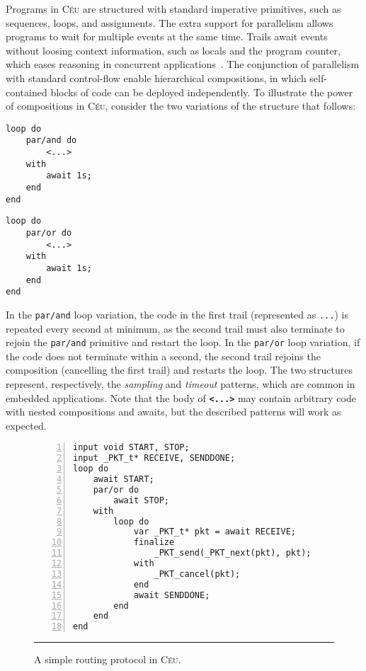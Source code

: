 \documentclass{sig-alternate-ipsn13}
\newcommand{\CEU}{\textsc{C\'{e}u}\xspace}
\newcommand{\code}[1] {{\small{\texttt{#1}}}}
\begin{document}
Programs in \CEU are structured with standard imperative primitives, such as 
sequences, loops, and assignments.
The extra support for parallelism allows programs to wait for multiple events 
at the same time.
Trails await events without loosing context information, such as locals and the 
program counter, which eases reasoning in concurrent 
applications~\cite{sync_async.cooperative}.
%
The conjunction of parallelism with standard control-flow enable hierarchical 
compositions, in which self-contained blocks of code can be deployed 
independently.
%
To illustrate the power of compositions in \CEU, consider the two variations of 
the structure that follows:

\begin{minipage}[t]{0.35\linewidth}
\begin{lstlisting}
loop do
    par/and do
        <...>
    with
        await 1s;
    end
end
\end{lstlisting}
\end{minipage}
%
\hspace{1cm}
%
\begin{minipage}[t]{0.35\linewidth}
\begin{lstlisting}
loop do
    par/or do
        <...>
    with
        await 1s;
    end
end
\end{lstlisting}
\end{minipage}

In the \code{par/and} loop variation, the code in the first trail (represented 
as \code{...}) is repeated every second at minimum, as the second trail must 
also terminate to rejoin the \code{par/and} primitive and restart the loop.
%
In the \code{par/or} loop variation, if the code does not terminate within a 
second, the second trail rejoins the composition (cancelling the first trail) 
and restarts the loop.
%
The two structures represent, respectively, the \emph{sampling} and 
\emph{timeout} patterns, which are common in embedded applications.
%
Note that the body of \textbf{\code{<...>}} may contain arbitrary code with 
nested compositions and awaits, but the described patterns will work as 
expected.

\begin{figure}[t]
\begin{lstlisting}[numbers=left,xleftmargin=3em]
input void START, STOP;
input _PKT_t* RECEIVE, SENDDONE;
loop do
    await START;
    par/or do
        await STOP;
    with
        loop do
            var _PKT_t* pkt = await RECEIVE;
            finalize
                _PKT_send(_PKT_next(pkt), pkt);
            with
                _PKT_cancel(pkt);
            end
            await SENDDONE;
        end
    end
end
\end{lstlisting}
\rule{8.6cm}{0.37pt}
\caption{ A simple routing protocol in \CEU.%
{\small %
}%
\label{lst.srp}
}
\end{figure}
\end{document}
